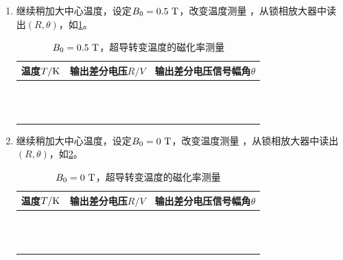 \documentclass[11pt,a4paper]{ctexart}
\newcommand{\unit}[1]{\rm \ #1}
\begin{document}
\begin{enumerate}
  \item
 继续稍加大中心温度，设定$B_0 = 0.5\unit{T}$，改变温度测量 ，从锁相放大器中读出$(R,\theta)$，如\cref{table11}。
  \begin{table}[H]
\centering
\caption{$B_0 = 0.5\unit{T}$，超导转变温度的磁化率测量\label{table11}}
\begin{tabular}{|p{32mm}|p{32mm}|p{32mm}|}
\hline
温度$T/{\rm K}$ & 输出差分电压$R/{V}$ & 输出差分电压信号幅角$\theta$ \\ \hline
& & \\ \hline
  & & \\ \hline
& & \\ \hline
   & & \\ \hline
    & & \\ \hline
 & & \\ \hline
  &  &\\ \hline
  &  &\\ \hline
  &  &\\ \hline
  &  &\\ \hline
  &  &\\ \hline
  &  &\\ \hline
  \end{tabular}
  \end{table}

  \item
 继续稍加大中心温度，设定$B_0 = 0\unit{T}$，改变温度测量 ，从锁相放大器中读出$(R,\theta)$，如\cref{table12}。
  \begin{table}[H]
\centering
\caption{$B_0 = 0\unit{T}$，超导转变温度的磁化率测量\label{table12}}
\begin{tabular}{|p{32mm}|p{32mm}|p{32mm}|}
\hline
温度$T/{\rm K}$ & 输出差分电压$R/{V}$ & 输出差分电压信号幅角$\theta$ \\ \hline
& & \\ \hline
  & & \\ \hline
& & \\ \hline
   & & \\ \hline
    & & \\ \hline
 & & \\ \hline
  &  &\\ \hline
  &  &\\ \hline
  &  &\\ \hline
  &  &\\ \hline
  &  &\\ \hline
  &  &\\ \hline
  \end{tabular}
  \end{table}
  \end{enumerate}
  
\end{document}
